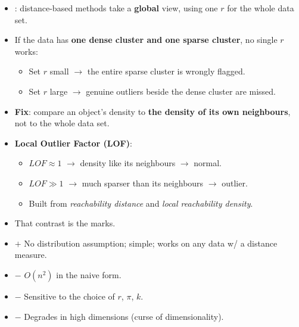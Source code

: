 {
\begin{itemize}
  \item {}: distance-based methods take a \textbf{global} view, using one $r$ for the
        whole data set.
  \item If the data has \textbf{one dense cluster and one sparse cluster}, no single $r$ works:
  \begin{itemize}
    \item Set $r$ small $\rightarrow$ the entire sparse cluster is wrongly flagged.
    \item Set $r$ large $\rightarrow$ genuine outliers beside the dense cluster are missed.
  \end{itemize}
  \item \textbf{Fix}: compare an object's density to \textbf{the density of its own neighbours}, not
        to the whole data set.
  \item \textbf{Local Outlier Factor (LOF)}:
  \begin{itemize}
    \item $LOF \approx 1$ $\rightarrow$ density like its neighbours $\rightarrow$ normal.
    \item $LOF \gg 1$ $\rightarrow$ much sparser than its neighbours $\rightarrow$ outlier.
    \item Built from \emph{reachability distance} and \emph{local reachability density}.
  \end{itemize}
  \item {} That contrast is
        the marks.
\end{itemize}
\begin{itemize}
  \item $+$ No distribution assumption; simple; works on any data w/ a distance measure.
  \item $-$ $O(n^2)$ in the naive form.
  \item $-$ Sensitive to the choice of $r$, $\pi$, $k$.
  \item $-$ Degrades in high dimensions (curse of dimensionality).
\end{itemize}}

